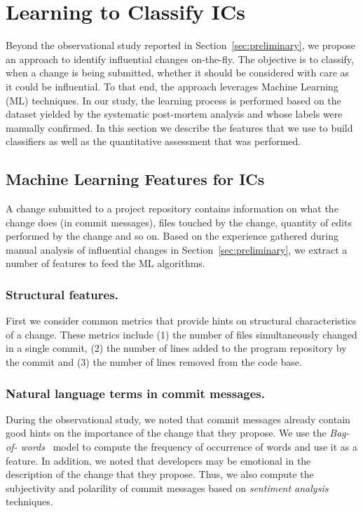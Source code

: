 \section{Learning to Classify IC{\scriptsize s}}
\label{sec:model}

Beyond the observational study reported in Section~\ref{sec:preliminary}, we
propose an approach to identify influential changes on-the-fly. The objective
is to classify, when a change is being submitted, whether it should be
considered with care as it could be influential. To that end, the approach
leverages Machine Learning (ML) techniques. In our study, the learning process
is performed based on the dataset yielded by the systematic post-mortem
analysis and whose labels were manually confirmed. In this section we describe
the features that we use to build classifiers as well as the quantitative
assessment that was performed.

\subsection{Machine Learning Features for ICs}

A change submitted to a project repository contains information on what the
change does (in commit messages), files touched by the change, quantity of
edits performed by the change and so on. Based on the experience gathered
during manual analysis of influential changes in
Section~\ref{sec:preliminary}, we extract a number of features to feed the ML
algorithms.


\subsubsection{Structural features.}
First we consider common metrics that provide hints on structural
characteristics of a change.
These metrics include (1) the number of files simultaneously changed in a single
commit, (2) the number of lines added to the program repository by the 
commit and (3) the number of lines removed from the code base.


\subsubsection{Natural language terms in commit messages.} During the
observational study, we noted that commit messages already contain good hints
on the importance of the change that they propose. We use the {\em Bag-of-
words}~\cite{lewis:ecml:1998} model to compute the frequency of occurrence of
words and use it as a feature. In addition, we noted that developers may be
emotional in the description of the change that they propose. Thus, we also
compute the subjectivity and polarility of commit messages based on {\em
sentiment analysis}~\cite{hu_opinion_2006,ohana_opinion_2009,
liu_sentiment_2010,thelwall_sentiment_2010} techniques.


